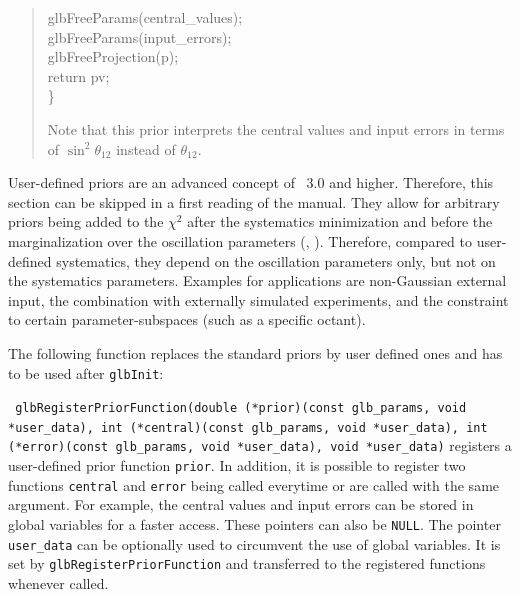 {\begin{quote}
{{  \hspace*{0.5cm} glbFreeParams(central\_values); \\
  \hspace*{0.5cm} glbFreeParams(input\_errors); \\
  \hspace*{0.5cm} glbFreeProjection(p); \\
  \hspace*{0.5cm} return pv; \\
\}
}
}

Note that this prior interprets the central values and input errors in terms of  $\sin^2 \theta_{12}$
instead of $\theta_{12}$.
\end{quote}
}

User-defined priors are an advanced concept of \GLOBES\ 3.0 and higher. Therefore,
this section can be skipped in a first reading of the manual.
They allow for arbitrary priors being added to the $\chi^2$ after the systematics
minimization and before the marginalization over the oscillation parameters (\cf, ).
Therefore, compared to user-defined systematics, they depend on the oscillation
parameters only, but not on the systematics parameters. Examples for applications
are non-Gaussian external input, the combination with externally simulated experiments, and the
constraint to certain parameter-subspaces (such as a specific octant).

The following function replaces the standard priors by user defined ones and has to be used
after {\tt glbInit}:
\begin{function}
{\tt 
glbRegisterPriorFunction(double (*prior)(const glb\_params, void *user\_data), int (*central)(const glb\_params, void *user\_data), int (*error)(const glb\_params, void *user\_data),  void *user\_data)} registers a user-defined prior function {\tt prior}. In addition, it is possible to register
two functions {\tt central} and {\tt error} being called everytime  or  are called with the same argument. For example, the central values and input errors can be stored in
global variables for a faster access. These pointers can also be {\tt NULL}. The pointer {\tt user\_data} can be optionally used to circumvent the use of global variables. It is set by {\tt glbRegisterPriorFunction} and transferred to the registered functions whenever called.
\end{function}

